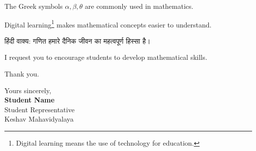 \documentclass[11pt,a4paper]{article}
\begin{document}
The Greek symbols \(\alpha,\beta,\theta\) are commonly used in mathematics.

Digital learning\footnote{Digital learning means the use of technology for education.}
makes mathematical concepts easier to understand.

{\hindifont हिंदी वाक्य: गणित हमारे दैनिक जीवन का महत्वपूर्ण हिस्सा है।}

I request you to encourage students to develop mathematical skills.

Thank you.

\vspace{10pt}
\begin{flushright}
Yours sincerely,\\
\textbf{Student Name}\\
Student Representative\\
Keshav Mahavidyalaya
\end{flushright}
\end{document}
